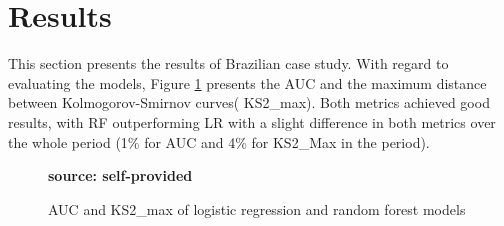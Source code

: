 \section{Results}
This section presents the results of Brazilian case study. With regard to evaluating the models, Figure \ref{fig:auc_ks2_max} presents the \gls{AUC} and the maximum distance between Kolmogorov-Smirnov curves(  KS2\_max)\cite{kolmogorov1933sulla}. Both metrics achieved good results, with \gls{RF} outperforming LR with a slight difference in both metrics over the whole period (1\% for \gls{AUC} and 4\% for KS2\_Max in the period). 

\begin{figure}[ht!]
\centering
\caption{\textmd{AUC and KS2\_max of logistic regression and random forest models}}
\label{fig:auc_ks2_max}
\par\medskip\ABNTEXfontereduzida\selectfont\textbf{source: self-provided}  
\par\medskip
\end{figure}



